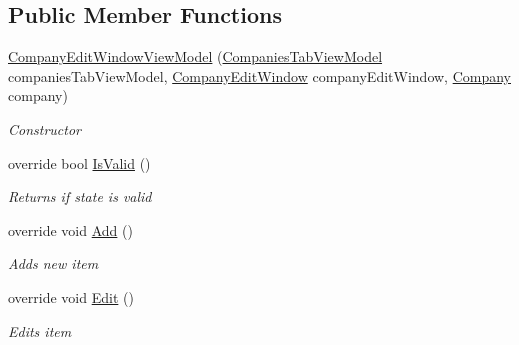 \subsection*{Public Member Functions}
\begin{DoxyCompactItemize}
\item 
\hyperlink{class_baudi_1_1_client_1_1_view_models_1_1_edit_window_view_models_1_1_company_edit_window_view_model_a3c710b9ef7ac1a76cc54ac378591cd49}{Company\+Edit\+Window\+View\+Model} (\hyperlink{class_baudi_1_1_client_1_1_view_models_1_1_tabs_view_models_1_1_companies_tab_view_model}{Companies\+Tab\+View\+Model} companies\+Tab\+View\+Model, \hyperlink{class_baudi_1_1_client_1_1_view_1_1_edit_windows_1_1_company_edit_window}{Company\+Edit\+Window} company\+Edit\+Window, \hyperlink{class_baudi_1_1_d_a_l_1_1_models_1_1_company}{Company} company)
\begin{DoxyCompactList}\small\item\em Constructor \end{DoxyCompactList}\item 
override bool \hyperlink{class_baudi_1_1_client_1_1_view_models_1_1_edit_window_view_models_1_1_company_edit_window_view_model_a2ed6ebf023930b5bd4432880049b5604}{Is\+Valid} ()
\begin{DoxyCompactList}\small\item\em Returns if state is valid \end{DoxyCompactList}\item 
override void \hyperlink{class_baudi_1_1_client_1_1_view_models_1_1_edit_window_view_models_1_1_company_edit_window_view_model_adc60a1ba31aa308245bcbc58ee7a598d}{Add} ()
\begin{DoxyCompactList}\small\item\em Adds new item \end{DoxyCompactList}\item 
override void \hyperlink{class_baudi_1_1_client_1_1_view_models_1_1_edit_window_view_models_1_1_company_edit_window_view_model_ac462d4ac40f92a6ae0672ffa69e2557d}{Edit} ()
\begin{DoxyCompactList}\small\item\em Edits item \end{DoxyCompactList}\end{DoxyCompactItemize}
